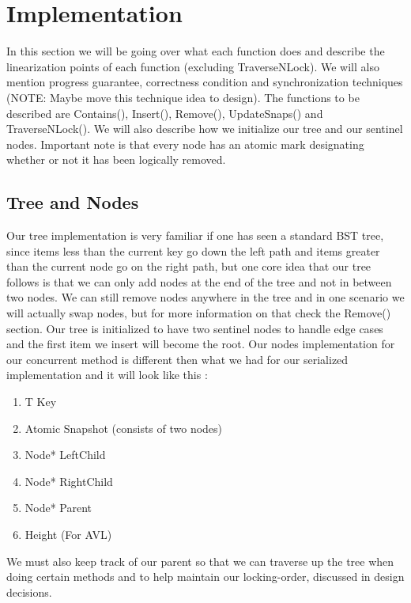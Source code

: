 \documentclass[conference]{IEEEtran}
\begin{document}

\section{Implementation}
In this section we will be going over what each function does and describe the linearization points of each function (excluding TraverseNLock). We will also mention progress guarantee, correctness condition and synchronization techniques (NOTE: Maybe move this technique idea to design). The functions to be described are Contains(), Insert(), Remove(), UpdateSnaps() and TraverseNLock(). We will also describe how we initialize our tree and our sentinel nodes. Important note is that every node has an atomic mark designating whether or not it has been logically removed.
\subsection{Tree and Nodes}
Our tree implementation is very familiar if one has seen a standard BST tree, since items less than the current key go down the left path and items greater than the current node go on the right path, but one core idea that our tree follows is that we can only add nodes at the end of the tree and not in between two nodes. We can still remove nodes anywhere in the tree and in one scenario we will actually swap nodes, but for more information on that check the Remove() section. Our tree is initialized to have two sentinel nodes to handle edge cases and the first item we insert will become the root. Our nodes implementation for our concurrent method is different then what we had for our serialized implementation and it will look like this :
\begin{enumerate}
\item T Key
\item Atomic Snapshot (consists of two nodes)
\item Node* LeftChild
\item Node* RightChild
\item Node* Parent
\item Height (For AVL)
\end{enumerate}
We must also keep track of our parent so that we can traverse up the tree when doing certain methods and to help maintain our locking-order, discussed in design decisions.
\end{document}
